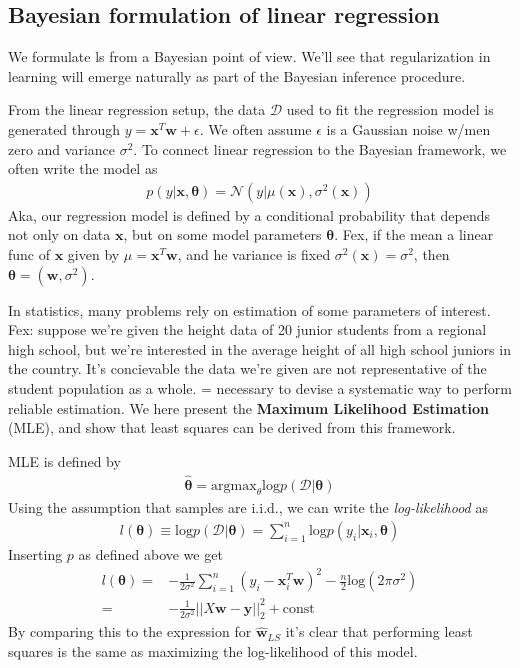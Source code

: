 \documentclass[norsk,a4paper,11pt]{article}
\begin{document}
\subsection{Bayesian formulation of linear regression}
We formulate ls from a Bayesian point of view. We'll see that regularization in learning will emerge naturally as part of the Bayesian inference procedure.

From the linear regression setup, the data $\mathcal{D}$ used to fit the regression model is generated through $y = \mathbf{x}^T \mathbf{w} + \epsilon$. We often assume $\epsilon$ is a Gaussian noise w/men zero and variance $\sigma^2$. To connect linear regression to the Bayesian framework, we often write the model as
\begin{align}
	p(y|\mathbf{x}, \bm{\theta}) = \mathcal{N} (y| \mu(\bm{x}), \sigma^2(\bm{x}))
\end{align}
Aka, our regression model is defined by a conditional probability that depends not only on data $\bm{x}$, but on some model parameters $\bm{\theta}$. Fex, if the mean a linear func of $\bm{x}$ given by $\mu = \bm{x}^T \bm{w}$, and he variance is fixed $\sigma^2(\bm{x}) = \sigma^2$, then $\bm{\theta} = (\bm{w}, \sigma^2)$.

In statistics, many problems rely on estimation of some parameters of interest. Fex: suppose we're given the height data of 20 junior students from a regional high school, but we're interested in the average height of all high school juniors in the country. It's concievable the data we're given are not representative of the student population as a whole. = necessary to devise a systematic way to perform reliable estimation. We here present the \textbf{Maximum Likelihood Estimation} (MLE), and show that least squares can be derived from this framework. 

MLE is defined by
\begin{align}
	\hat{\bm{\theta}} = \text{argmax}_\theta \text{log} p(\mathcal{D} | \bm{\theta})
\end{align} 
Using the assumption that samples are i.i.d., we can write the \textit{log-likelihood} as
\begin{align}
	l (\bm{\theta}) \equiv \text{log}p(\mathcal{D} | \bm{\theta}) = \sum_{i = 1}^n \text{log} p(y_i | \bm{x}_i , \bm{\theta})
\end{align}
Inserting $p$ as defined above we get
\begin{align}
	l(\bm{\theta}) =& - \frac{1}{2\sigma^2} \sum_{i=1}^n (y_i - \bm{x}_i^T \bm{w})^2 - \frac{n}{2} \text{log} (2\pi \sigma^2) \\
	=& - \frac{1}{2 \sigma^2} ||X \bm{w} - \bm{y}||_2^2 + \text{const}
\end{align}
By comparing this to the expression for $\hat{\bm{w}}_{LS}$ it's clear that performing least squares is the same as maximizing the log-likelihood of this model.
\end{document}
